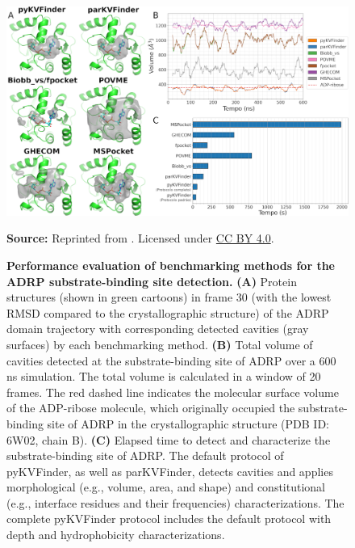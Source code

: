 \documentclass[Ingles]{phdthesis}
\def\eg{e.g.\onedot}
\begin{document}
\begin{figure}[h]
  \centering
  \includegraphics[scale=1]{images/pykvfinder-benchmarking.png}
  \centerline{\tiny{\textbf{Source:} Reprinted from \cite{guerra2021}. Licensed under \href{https://creativecommons.org/licenses/by/4.0/}{CC BY 4.0}.}}
  \caption[Performance evaluation of benchmarking methods for the ADRP substrate-binding site detection]{\textbf{Performance evaluation of benchmarking methods for the ADRP substrate-binding site detection.} \textbf{(A)} Protein structures (shown in green cartoons) in frame 30 (with the lowest RMSD compared to the crystallographic structure) of the ADRP domain trajectory with corresponding detected cavities (gray surfaces) by each benchmarking method. \textbf{(B)} Total volume of cavities detected at the substrate-binding site of ADRP over a 600 ns simulation. The total volume is calculated in a window of 20 frames. The red dashed line indicates the molecular surface volume of the ADP-ribose molecule, which originally occupied the substrate-binding site of ADRP in the crystallographic structure (PDB ID: 6W02, chain B). \textbf{(C)} Elapsed time to detect and characterize the substrate-binding site of ADRP. The default protocol of pyKVFinder, as well as parKVFinder, detects cavities and applies morphological (\eg, volume, area, and shape) and constitutional (e.g., interface residues and their frequencies) characterizations. The complete pyKVFinder protocol includes the default protocol with depth and hydrophobicity characterizations.}
  \label{fig:pykvfinder-benchmarking}
\end{figure}
\end{document}
